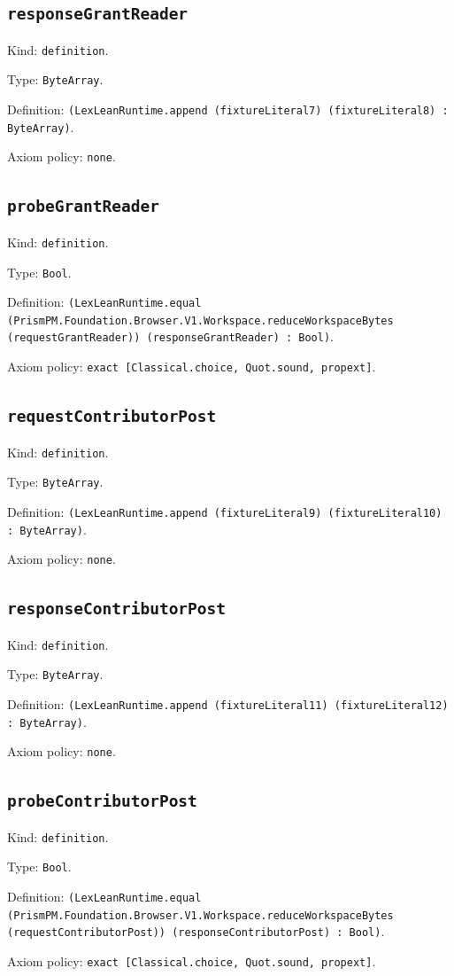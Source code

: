 \documentclass[11pt]{article}
\begin{document}
\subsection*{\texttt{responseGrantReader}}
\noindent Kind: \texttt{definition}.\par
\noindent Type: \texttt{ByteArray}.\par
\noindent Definition: \texttt{(LexLeanRuntime.append (fixtureLiteral7) (fixtureLiteral8) : ByteArray)}.\par
\noindent Axiom policy: \texttt{none}.\par
\subsection*{\texttt{probeGrantReader}}
\noindent Kind: \texttt{definition}.\par
\noindent Type: \texttt{Bool}.\par
\noindent Definition: \texttt{(LexLeanRuntime.equal (PrismPM.Foundation.Browser.V1.Workspace.reduceWorkspaceBytes (requestGrantReader)) (responseGrantReader) : Bool)}.\par
\noindent Axiom policy: \texttt{exact [Classical.choice, Quot.sound, propext]}.\par
\subsection*{\texttt{requestContributorPost}}
\noindent Kind: \texttt{definition}.\par
\noindent Type: \texttt{ByteArray}.\par
\noindent Definition: \texttt{(LexLeanRuntime.append (fixtureLiteral9) (fixtureLiteral10) : ByteArray)}.\par
\noindent Axiom policy: \texttt{none}.\par
\subsection*{\texttt{responseContributorPost}}
\noindent Kind: \texttt{definition}.\par
\noindent Type: \texttt{ByteArray}.\par
\noindent Definition: \texttt{(LexLeanRuntime.append (fixtureLiteral11) (fixtureLiteral12) : ByteArray)}.\par
\noindent Axiom policy: \texttt{none}.\par
\subsection*{\texttt{probeContributorPost}}
\noindent Kind: \texttt{definition}.\par
\noindent Type: \texttt{Bool}.\par
\noindent Definition: \texttt{(LexLeanRuntime.equal (PrismPM.Foundation.Browser.V1.Workspace.reduceWorkspaceBytes (requestContributorPost)) (responseContributorPost) : Bool)}.\par
\noindent Axiom policy: \texttt{exact [Classical.choice, Quot.sound, propext]}.\par
\end{document}
